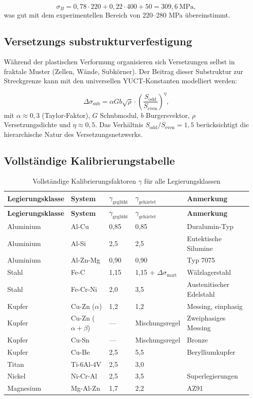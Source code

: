 \documentclass[12pt,a4paper]{article}
\begin{document}
\[
\sigma_B = 0,78 \cdot 220 + 0,22 \cdot 400 + 50 = 309,6\ \text{MPa},
\]
was gut mit dem experimentellen Bereich von 220–280 MPa übereinstimmt.

\subsection{Versetzungs substrukturverfestigung}
\label{subsec:dislocation-substructure}

Während der plastischen Verformung organisieren sich Versetzungen selbst in fraktale Muster (Zellen, Wände, Subkörner). Der Beitrag dieser Substruktur zur Streckgrenze kann mit den universellen YUCT-Konstanten modelliert werden:

\[
\Delta\sigma_{\text{sub}} = \alpha G b \sqrt{\rho} \cdot \left( \frac{S_{\text{odd}}}{S_{\text{even}}} \right)^{\eta},
\]
mit \(\alpha \approx 0,3\) (Taylor-Faktor), \(G\) Schubmodul, \(b\) Burgersvektor, \(\rho\) Versetzungsdichte und \(\eta \approx 0,5\). Das Verhältnis \(S_{\text{odd}}/S_{\text{even}}=1,5\) berücksichtigt die hierarchische Natur des Versetzungsnetzwerks.

\subsection{Vollständige Kalibrierungstabelle}
\label{subsec:complete-calibration}

\begin{longtable}{p{3cm}p{2.5cm}p{2.5cm}p{2.5cm}p{4cm}}
	\caption{Vollständige Kalibrierungsfaktoren \(\gamma\) für alle Legierungsklassen} \label{tab:complete-gamma} \\
	\toprule
	\textbf{Legierungsklasse} & \textbf{System} & \(\gamma_{\text{geglüht}}\) & \(\gamma_{\text{gehärtet}}\) & \textbf{Anmerkung} \\
	\midrule
	\endfirsthead
	\toprule
	\textbf{Legierungsklasse} & \textbf{System} & \(\gamma_{\text{geglüht}}\) & \(\gamma_{\text{gehärtet}}\) & \textbf{Anmerkung} \\
	\midrule
	\endhead
	Aluminium & Al-Cu & 0,85 & 0,85 & Duralumin-Typ \\
	Aluminium & Al-Si & 2,5 & 2,5 & Eutektische Silumine \\
	Aluminium & Al-Zn-Mg & 0,90 & 0,90 & Typ 7075 \\
	Stahl & Fe-C & 1,15 & 1,15 + \(\Delta\sigma_{\text{mart}}\) & Wälzlagerstahl \\
	Stahl & Fe-Cr-Ni & 2,0 & 3,5 & Austenitischer Edelstahl \\
	Kupfer & Cu-Zn (\(\alpha\)) & 1,2 & 1,2 & Messing, einphasig \\
	Kupfer & Cu-Zn (\(\alpha+\beta\)) & — & Mischungsregel & Zweiphasiges Messing \\
	Kupfer & Cu-Sn & — & Mischungsregel & Bronze \\
	Kupfer & Cu-Be & 2,5 & 5,5 & Berylliumkupfer \\
	Titan & Ti-6Al-4V & 2,5 & 3,0 & \\
	Nickel & Ni-Cr-Al & 2,5 & 3,5 & Superlegierungen \\
	Magnesium & Mg-Al-Zn & 1,7 & 2,2 & AZ91 \\
	\bottomrule
\end{longtable}
\end{document}
